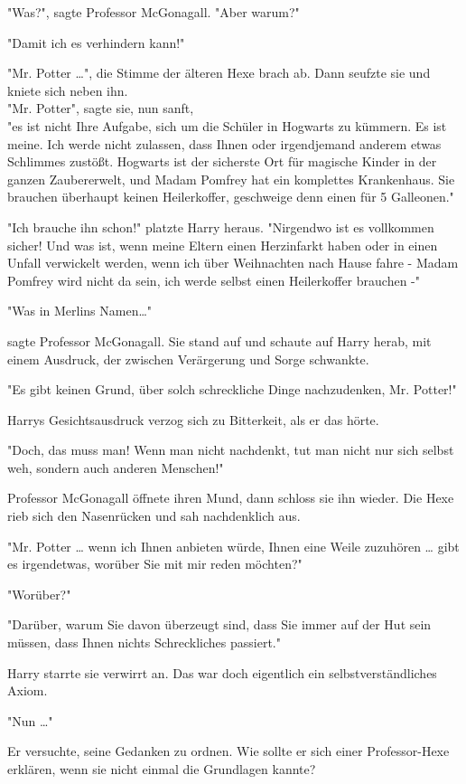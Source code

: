 {"Was?", sagte Professor McGonagall. "Aber warum?"

"Damit ich es verhindern kann!"

"Mr. Potter …", die Stimme der älteren Hexe brach ab. Dann seufzte sie und kniete sich neben ihn.\\ "Mr. Potter", sagte sie, nun sanft,\\ "es ist nicht Ihre Aufgabe, sich um die Schüler in Hogwarts zu kümmern. Es ist meine. Ich werde nicht zulassen, dass Ihnen oder irgendjemand anderem etwas Schlimmes zustößt. Hogwarts ist der sicherste Ort für magische Kinder in der ganzen Zaubererwelt, und Madam Pomfrey hat ein komplettes Krankenhaus. Sie brauchen überhaupt keinen Heilerkoffer, geschweige denn einen für 5 Galleonen."

"Ich brauche ihn schon!" platzte Harry heraus. "Nirgendwo ist es vollkommen sicher! Und was ist, wenn meine Eltern einen Herzinfarkt haben oder in einen Unfall verwickelt werden, wenn ich über Weihnachten nach Hause fahre - Madam Pomfrey wird nicht da sein, ich werde selbst einen Heilerkoffer brauchen -"

"Was in Merlins Namen…"

sagte Professor McGonagall. Sie stand auf und schaute auf Harry herab, mit einem Ausdruck, der zwischen Verärgerung und Sorge schwankte.

"Es gibt keinen Grund, über solch schreckliche Dinge nachzudenken, Mr. Potter!"

Harrys Gesichtsausdruck verzog sich zu Bitterkeit, als er das hörte.

"Doch, das muss man! Wenn man nicht nachdenkt, tut man nicht nur sich selbst weh, sondern auch anderen Menschen!"

Professor McGonagall öffnete ihren Mund, dann schloss sie ihn wieder. Die Hexe rieb sich den Nasenrücken und sah nachdenklich aus.

"Mr. Potter … wenn ich Ihnen anbieten würde, Ihnen eine Weile zuzuhören … gibt es irgendetwas, worüber Sie mit mir reden möchten?"

"Worüber?"

"Darüber, warum Sie davon überzeugt sind, dass Sie immer auf der Hut sein müssen, dass Ihnen nichts Schreckliches passiert."

Harry starrte sie verwirrt an. Das war doch eigentlich ein selbstverständliches Axiom.

"Nun …"

Er versuchte, seine Gedanken zu ordnen. Wie sollte er sich einer Professor-Hexe erklären, wenn sie nicht einmal die Grundlagen kannte?

}
